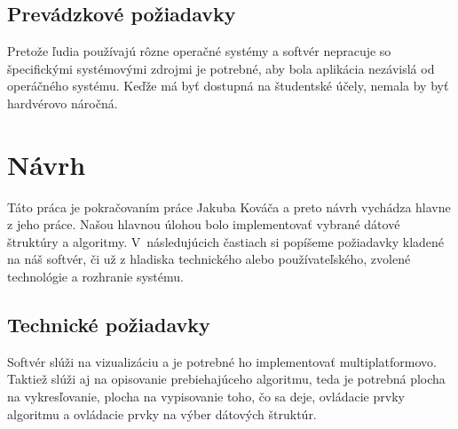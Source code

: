 \subsection{Prevádzkové požiadavky}

Pretože ľudia používajú rôzne operačné systémy a softvér nepracuje so 
špecifickými systémovými zdrojmi je potrebné, aby bola aplikácia nezávislá 
od operáčného systému. Keďže má byť dostupná na študentské účely, nemala by 
byť hardvérovo náročná.

\section{Návrh}

Táto práca je pokračovaním práce Jakuba Kováča a preto návrh vychádza hlavne z 
jeho práce. Našou hlavnou úlohou bolo implementovať vybrané dátové štruktúry a 
algoritmy. V~následujúcich častiach si popíšeme požiadavky kladené na náš 
softvér, či už z hladiska technického alebo používateľského, zvolené 
technológie a rozhranie systému.

\subsection{Technické požiadavky}

Softvér slúži na vizualizáciu a je potrebné ho implementovať multiplatformovo.
Taktiež slúži aj na opisovanie prebiehajúceho algoritmu, teda 
je potrebná plocha na vykresľovanie, plocha na vypisovanie toho, čo sa deje, 
ovládacie prvky algoritmu a ovládacie prvky na výber dátových štruktúr.

